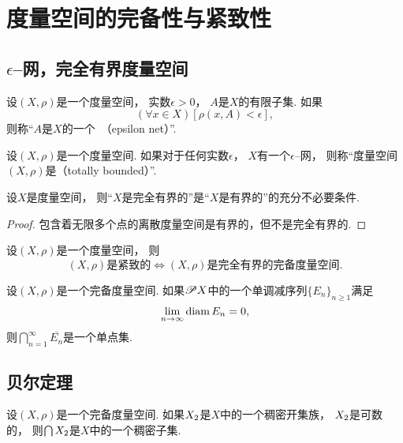 \section{度量空间的完备性与紧致性}
\subsection{\texorpdfstring{$\epsilon$--网}{\textepsilon 网}，完全有界度量空间}
\begin{definition}
设\((X,\rho)\)是一个度量空间，
实数\(\epsilon>0\)，
\(A\)是\(X\)的有限子集.
如果\[
	(\forall x \in X)
	[\rho(x,A) < \epsilon],
\]
则称“\(A\)是\(X\)的一个~（epsilon net）”.
\end{definition}

\begin{definition}
设\((X,\rho)\)是一个度量空间.
如果对于任何实数\(\epsilon\)，
\(X\)有一个\(\epsilon\)--网，
则称“度量空间\((X,\rho)\)是（totally bounded）”.
\end{definition}

\begin{proposition}
设\(X\)是度量空间，
则“\(X\)是完全有界的”是“\(X\)是有界的”的充分不必要条件.
\begin{proof}
包含着无限多个点的离散度量空间是有界的，但不是完全有界的.
\end{proof}
\end{proposition}

\begin{theorem}
设\((X,\rho)\)是一个度量空间，
则\[
	\text{$(X,\rho)$是紧致的}
	\iff
	\text{$(X,\rho)$是完全有界的完备度量空间}.
\]
\end{theorem}

\begin{theorem}
设\((X,\rho)\)是一个完备度量空间.
如果\(\mathscr{P} X\)中的一个单调减序列\(\{E_n\}_{n\geq1}\)满足\[
	\lim_{n\to\infty} \operatorname{diam} E_n = 0,
\]
则\(\bigcap_{n=1}^\infty \overline{E_n}\)是一个单点集.
\end{theorem}

\subsection{贝尔定理}
\begin{theorem}[贝尔定理]\label{theorem:度量空间的完备性与紧致性.贝尔定理1}
设\((X,\rho)\)是一个完备度量空间.
如果\(X_2\)是\(X\)中的一个稠密开集族，
\(X_2\)是可数的，
则\(\bigcap X_2\)是\(X\)中的一个稠密子集.
\end{theorem}

